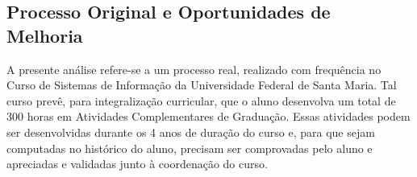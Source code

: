 \documentclass[12pt]{article}
\begin{document}





\subsection{Processo Original e Oportunidades de Melhoria}

A presente análise refere-se a um processo real, realizado com frequência no Curso de Sistemas de Informação da Universidade Federal de Santa Maria. Tal curso prevê, para integralização curricular, que o aluno desenvolva um total de 300 horas em Atividades Complementares de Graduação. Essas atividades podem ser desenvolvidas durante os 4 anos de duração do curso e, para que sejam computadas no histórico do aluno, precisam ser comprovadas pelo aluno e apreciadas e validadas junto à coordenação do curso.
\end{document}
